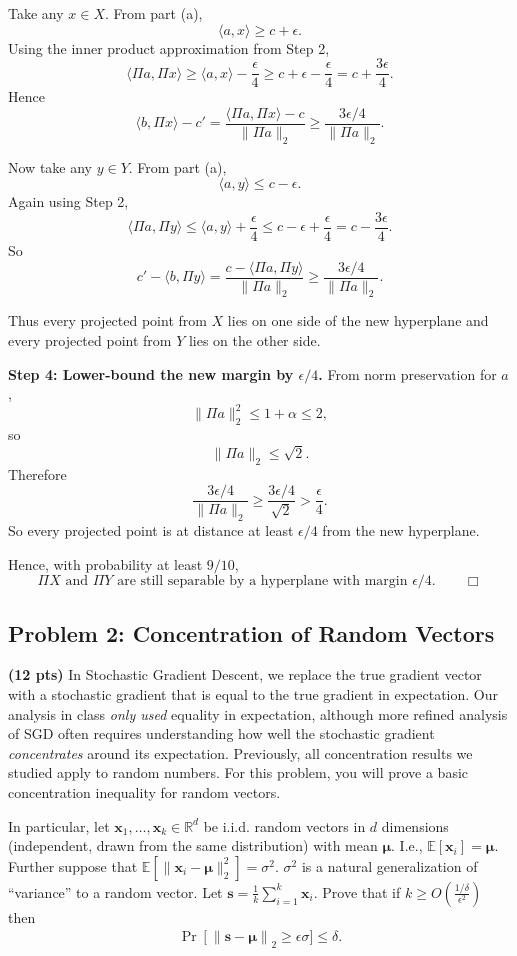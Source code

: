 \documentclass[10pt]{article}
\newcommand{\bs}[1]{\boldsymbol{#1}}
\newcommand{\bv}[1]{\mathbf{#1}}
\newcommand{\R}{\mathbb{R}}
\newcommand{\E}{\mathbb{E}}
\begin{document}
Take any $x\in X$. From part (a),
\[
\langle a,x\rangle \ge c+\epsilon.
\]
Using the inner product approximation from Step 2,
\[
\langle \Pi a,\Pi x\rangle
\ge
\langle a,x\rangle - \frac{\epsilon}{4}
\ge
c+\epsilon-\frac{\epsilon}{4}
=
c+\frac{3\epsilon}{4}.
\]
Hence
\[
\langle b,\Pi x\rangle - c'
=
\frac{\langle \Pi a,\Pi x\rangle - c}{\|\Pi a\|_2}
\ge
\frac{3\epsilon/4}{\|\Pi a\|_2}.
\]

Now take any $y\in Y$. From part (a),
\[
\langle a,y\rangle \le c-\epsilon.
\]
Again using Step 2,
\[
\langle \Pi a,\Pi y\rangle
\le
\langle a,y\rangle + \frac{\epsilon}{4}
\le
c-\epsilon+\frac{\epsilon}{4}
=
c-\frac{3\epsilon}{4}.
\]
So
\[
c' - \langle b,\Pi y\rangle
=
\frac{c-\langle \Pi a,\Pi y\rangle}{\|\Pi a\|_2}
\ge
\frac{3\epsilon/4}{\|\Pi a\|_2}.
\]

Thus every projected point from $X$ lies on one side of the new hyperplane and every projected point from $Y$ lies on the other side.

\medskip
\textbf{Step 4: Lower-bound the new margin by $\epsilon/4$.}
From norm preservation for $a$,
\[
\|\Pi a\|_2^2 \le 1+\alpha \le 2,
\]
so
\[
\|\Pi a\|_2 \le \sqrt{2}.
\]
Therefore
\[
\frac{3\epsilon/4}{\|\Pi a\|_2}
\ge
\frac{3\epsilon/4}{\sqrt{2}}
>
\frac{\epsilon}{4}.
\]
So every projected point is at distance at least $\epsilon/4$ from the new hyperplane.

Hence, with probability at least $9/10$,
\[
\boxed{
\Pi X \text{ and } \Pi Y \text{ are still separable by a hyperplane with margin } \epsilon/4.
}
\qquad \Box
\]



\subsection{Problem 2: Concentration of Random Vectors}
\textbf{(12 pts)} In Stochastic Gradient Descent, we replace the true gradient vector with a stochastic gradient that is equal to the true gradient in expectation. Our analysis in class \emph{only used} equality in expectation, although more refined analysis of SGD often requires understanding how well the stochastic gradient \emph{concentrates} around its expectation. Previously, all concentration results we studied apply to random numbers.  For this problem, you will prove a basic concentration inequality for random vectors. 

In particular, let $\bv{x}_1, \ldots, \bv{x}_k \in \R^d$ be i.i.d. random vectors in $d$ dimensions (independent, drawn from the same distribution) with mean $\bs{\mu}$. I.e., $\E[\bv{x}_i] = \bs{\mu}$. Further suppose that $\E\left[\|\bv{x}_i - \bs{\mu}\|_2^2\right] = \sigma^2$. $\sigma^2$ is a natural generalization of ``variance'' to a random vector. Let $\bv{s} = \frac{1}{k}\sum_{i=1}^k\bv{x}_i$. Prove that if $k \geq O\left(\frac{1/\delta}{\epsilon^2}\right)$ then
\begin{align*}
	\Pr\left[\|\bv{s} - \bs{\mu}\right\|_2 \geq \epsilon \sigma] \leq \delta.
\end{align*}
\end{document}
